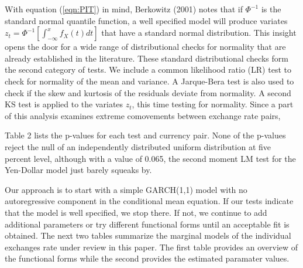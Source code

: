 \documentclass[12pt]{article}
\begin{document}
With equation (\ref{eqn:PIT}) in mind, Berkowitz (2001) notes that if $\Phi^{-1}$ is the standard normal quantile function, a well specified model will produce variates $z_{t} = \Phi^{-1}\left[\int_{-\infty}^{x} f_{X}\left(t\right) dt \right]$ that have a standard normal distribution. This insight opens the door for a wide range of distributional checks for normality that are already established in the literature. These standard distributional checks form the second category of tests. We include a common likelihood ratio (LR) test to check for normality of the mean and variance. A Jarque-Bera test is also used to check if the skew and kurtosis of the residuals deviate from normality. A second KS test is applied to the variates $z_{t}$, this time testing for normality. Since a part of this analysis examines extreme comovements between exchange rate pairs,  


Table 2 lists the p-values for each test and currency pair. None of the p-values reject the null of an independently distributed uniform distribution at five percent level, although with a value of 0.065, the second moment LM test for the Yen-Dollar model just barely squeaks by.


Our approach is to start with a simple GARCH(1,1) model with no autoregressive component in the conditional mean equation. If our tests indicate that the model is well specified, we stop there. If not, we continue to add additional parameters or try different functional forms until an acceptable fit is obtained. The next two tables summarize the marginal models of the individual exchanges rate under review in this paper. The first table provides an overview of the functional forms while the second provides the estimated paramater values.

\vspace{10mm}
\end{document}
